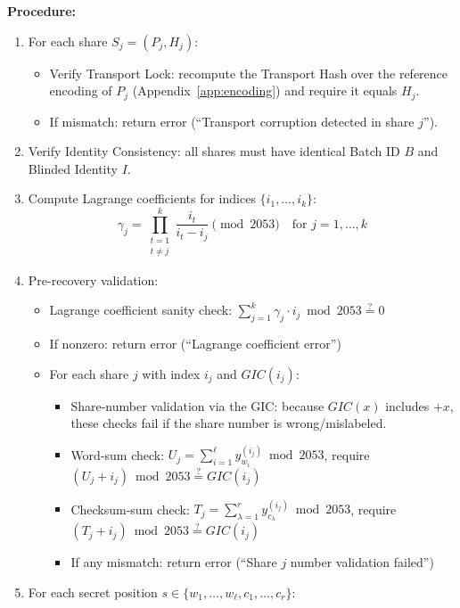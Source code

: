 \documentclass[11pt]{article}
\begin{document}
\textbf{Procedure:}
\begin{enumerate}[noitemsep]
    \item For each share $S_j = (P_j, H_j)$:
    \begin{itemize}[noitemsep]
        \item Verify Transport Lock: recompute the Transport Hash over the reference encoding of $P_j$ (Appendix~\ref{app:encoding}) and require it equals $H_j$.
        \item If mismatch: return error (``Transport corruption detected in share $j$'').
    \end{itemize}
    \item Verify Identity Consistency: all shares must have identical Batch ID $B$ and Blinded Identity $I$.
    \item Compute Lagrange coefficients for indices $\{i_1, \ldots, i_k\}$:
    \[
    \gamma_j = \prod_{\substack{t=1 \\ t \neq j}}^k \frac{i_t}{i_t - i_j} \pmod{2053} \quad \text{for } j = 1, \ldots, k
    \]
    \item Pre-recovery validation:
    \begin{itemize}[noitemsep]
        \item Lagrange coefficient sanity check: $\sum_{j=1}^{k} \gamma_j \cdot i_j \bmod 2053 \stackrel{?}{=} 0$
        \item If nonzero: return error (``Lagrange coefficient error'')
        \item For each share $j$ with index $i_j$ and $GIC(i_j)$:
        \begin{itemize}[noitemsep]
            \item Share-number validation via the GIC: because $GIC(x)$ includes $+x$, these checks fail if the share number is wrong/mislabeled.
            \item Word-sum check: $U_j = \sum_{i=1}^{\ell} y_{w_i}^{(i_j)} \bmod 2053$, require $(U_j + i_j) \bmod 2053 \stackrel{?}{=} GIC(i_j)$
            \item Checksum-sum check: $T_j = \sum_{\lambda=1}^{r} y_{c_\lambda}^{(i_j)} \bmod 2053$, require $(T_j + i_j) \bmod 2053 \stackrel{?}{=} GIC(i_j)$
            \item If any mismatch: return error (``Share $j$ number validation failed'')
        \end{itemize}
    \end{itemize}
    \item For each secret position $s \in \{w_1, \ldots, w_\ell, c_1, \ldots, c_r\}$:

\end{enumerate}
\end{document}
